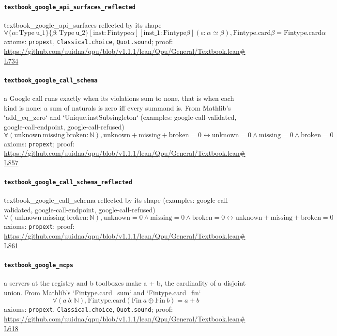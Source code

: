 \documentclass[11pt]{article}
\begin{document}
\paragraph{\texttt{textbook\_google\_api\_surfaces\_reflected}}
textbook\_google\_api\_surfaces reflected by its shape
\[ \forall \{\alpha : \mathrm{Type}\ \mathrm{u\_1}\} \{\beta : \mathrm{Type}\ \mathrm{u\_2}\} [\mathrm{inst} : \mathrm{Fintype} \alpha ] [\mathrm{inst\_1} : \mathrm{Fintype} \beta ] (e : \alpha \simeq \beta ), \mathrm{Fintype.card} \beta = \mathrm{Fintype.card} \alpha  \]
\noindent axioms: \texttt{propext}, \texttt{Classical.choice}, \texttt{Quot.sound}; proof: \url{https://github.com/uuidna/qpu/blob/v1.1.1/lean/Qpu/General/Textbook.lean\#L734}

\paragraph{\texttt{textbook\_google\_call\_schema}}
a Google call runs exactly when its violations sum to none, that is when each kind is none: a sum of naturals is zero iff every summand is. From Mathlib's `add\_eq\_zero` and `Unique.instSubsingleton` (examples: google-call-validated, google-call-endpoint, google-call-refused)
\[ \forall (\mathrm{unknown}\ \mathrm{missing}\ \mathrm{broken} : \mathbb{N}), \mathrm{unknown} + \mathrm{missing} + \mathrm{broken} = 0 \leftrightarrow \mathrm{unknown} = 0 \land \mathrm{missing} = 0 \land \mathrm{broken} = 0 \]
\noindent axioms: \texttt{propext}; proof: \url{https://github.com/uuidna/qpu/blob/v1.1.1/lean/Qpu/General/Textbook.lean\#L857}

\paragraph{\texttt{textbook\_google\_call\_schema\_reflected}}
textbook\_google\_call\_schema reflected by its shape (examples: google-call-validated, google-call-endpoint, google-call-refused)
\[ \forall (\mathrm{unknown}\ \mathrm{missing}\ \mathrm{broken} : \mathbb{N}), \mathrm{unknown} = 0 \land \mathrm{missing} = 0 \land \mathrm{broken} = 0 \leftrightarrow \mathrm{unknown} + \mathrm{missing} + \mathrm{broken} = 0 \]
\noindent axioms: \texttt{propext}; proof: \url{https://github.com/uuidna/qpu/blob/v1.1.1/lean/Qpu/General/Textbook.lean\#L861}

\paragraph{\texttt{textbook\_google\_mcps}}
a servers at the registry and b toolboxes make a + b, the cardinality of a disjoint union. From Mathlib's `Fintype.card\_sum` and `Fintype.card\_fin`
\[ \forall (a\ b : \mathbb{N}), \mathrm{Fintype.card} (\mathrm{Fin}\ a \oplus \mathrm{Fin}\ b) = a + b \]
\noindent axioms: \texttt{propext}, \texttt{Classical.choice}, \texttt{Quot.sound}; proof: \url{https://github.com/uuidna/qpu/blob/v1.1.1/lean/Qpu/General/Textbook.lean\#L618}
\end{document}
